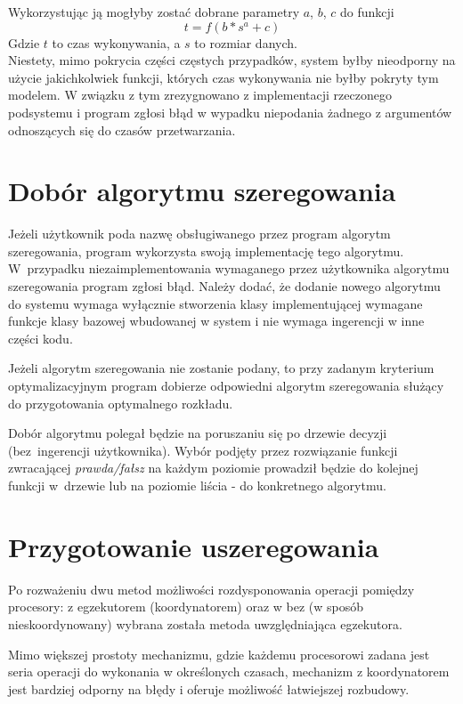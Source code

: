 \documentclass[brudnopis]{xmgr}
\begin{document}
Wykorzystując ją mogłyby zostać dobrane parametry $a$, $b$, $c$ do funkcji
$$t = f(b * s^a + c)$$
Gdzie $t$ to czas wykonywania, a $s$ to rozmiar danych.\\
Niestety, mimo pokrycia części częstych przypadków, system byłby nieodporny na użycie jakichkolwiek funkcji, których czas wykonywania nie byłby pokryty tym modelem.
W związku z tym zrezygnowano z implementacji rzeczonego podsystemu i program zgłosi błąd w wypadku niepodania żadnego z argumentów odnoszących się do czasów przetwarzania.
\medskip


\section{Dobór algorytmu szeregowania}

Jeżeli użytkownik poda nazwę obsługiwanego przez program algorytm szeregowania, program wykorzysta swoją implementację tego algorytmu. W~przypadku niezaimplementowania wymaganego przez użytkownika algorytmu szeregowania program zgłosi błąd.
Należy dodać, że dodanie nowego algorytmu do systemu wymaga wyłącznie stworzenia klasy implementującej wymagane funkcje klasy bazowej wbudowanej w system i nie wymaga ingerencji w inne części kodu.
\medskip

Jeżeli algorytm szeregowania nie zostanie podany, to przy zadanym kryterium optymalizacyjnym program dobierze odpowiedni algorytm szeregowania służący do przygotowania optymalnego rozkładu.
\medskip

Dobór algorytmu polegał będzie na poruszaniu się po drzewie decyzji (bez~ingerencji użytkownika).
Wybór podjęty przez rozwiązanie funkcji zwracającej \emph{prawda/fałsz} na każdym poziomie prowadził będzie do kolejnej funkcji w~drzewie lub na poziomie liścia - do konkretnego algorytmu.


\section{Przygotowanie uszeregowania}

Po rozważeniu dwu metod możliwości rozdysponowania operacji pomiędzy procesory: z egzekutorem (koordynatorem) oraz w bez (w sposób nieskoordynowany) wybrana została metoda uwzględniająca egzekutora.
\medskip

Mimo większej prostoty mechanizmu, gdzie każdemu procesorowi zadana jest seria operacji do wykonania w określonych czasach, mechanizm z koordynatorem jest bardziej odporny na błędy i oferuje możliwość łatwiejszej rozbudowy.
\end{document}
